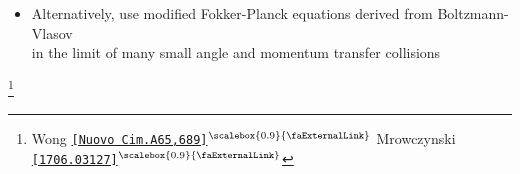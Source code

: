 \documentclass[aspectratio=169,11pt,usenames,dvipsnames]{beamer}
\renewcommand{\thefootnote}{\color{customblue}\faPaperPlaneO}
\newcommand\blfootnote[1]{%
  \begingroup
  \renewcommand\thefootnote{}\footnote{#1}%
  \addtocounter{footnote}{-1}%
  \endgroup
}
\begin{document}
\begin{frame}
\begin{itemize}
        \item \begin{center}\footnotesize Alternatively, use modified {\color{palgold}Fokker-Planck equations} derived from Boltzmann-Vlasov \\ in the limit of many small angle and momentum transfer collisions \end{center} 
    \end{itemize}
    \vspace{-5pt}
    \blfootnote{\scriptsize Wong \href{https://link.springer.com/article/10.1007/BF02892134}{{\color{palteal}\texttt{[Nuovo Cim.A65,689]}$^\text{\scalebox{0.9}{\faExternalLink}}$}} Mrowczynski \href{https://arxiv.org/abs/1706.03127}{{\color{palgold}\texttt{[1706.03127]}$^\text{\scalebox{0.9}{\faExternalLink}}$}}}
\end{frame}


\end{document}
